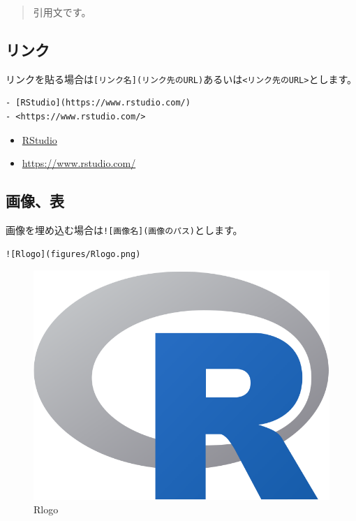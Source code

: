 \documentclass[]{bxjsreport}
\providecommand{\tightlist}{%
  \setlength{\itemsep}{0pt}\setlength{\parskip}{0pt}}
\let\asdf\section
\renewcommand{\section}{\chapter}
\let\asdff\subsection
\renewcommand{\subsection}{\asdf}
\renewcommand{\subsubsection}{\asdff}
\begin{document}
\begin{quote}
引用文です。
\end{quote}

\hypertarget{ux30eaux30f3ux30af}{%
\subsubsection{リンク}\label{ux30eaux30f3ux30af}}

リンクを貼る場合は\texttt{{[}リンク名{]}(リンク先のURL)}あるいは\texttt{\textless{}リンク先のURL\textgreater{}}とします。

\begin{verbatim}
- [RStudio](https://www.rstudio.com/)
- <https://www.rstudio.com/>
\end{verbatim}

\begin{itemize}
\tightlist
\item
  \href{https://www.rstudio.com/}{RStudio}
\item
  \url{https://www.rstudio.com/}
\end{itemize}

\hypertarget{ux753bux50cfux8868}{%
\subsubsection{画像、表}\label{ux753bux50cfux8868}}

画像を埋め込む場合は\texttt{!{[}画像名{]}(画像のパス)}とします。

\begin{verbatim}
![Rlogo](figures/Rlogo.png)
\end{verbatim}

\begin{figure}
\centering
\includegraphics{figures/Rlogo.png}
\caption{Rlogo}
\end{figure}
\end{document}
